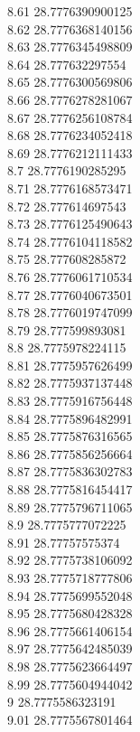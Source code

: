{8.61	28.7776390900125\\
8.62	28.7776368140156\\
8.63	28.7776345498809\\
8.64	28.777632297554\\
8.65	28.7776300569806\\
8.66	28.7776278281067\\
8.67	28.7776256108784\\
8.68	28.7776234052418\\
8.69	28.7776212111433\\
8.7	28.7776190285295\\
8.71	28.7776168573471\\
8.72	28.777614697543\\
8.73	28.7776125490643\\
8.74	28.7776104118582\\
8.75	28.777608285872\\
8.76	28.7776061710534\\
8.77	28.7776040673501\\
8.78	28.7776019747099\\
8.79	28.777599893081\\
8.8	28.7775978224115\\
8.81	28.7775957626499\\
8.82	28.7775937137448\\
8.83	28.7775916756448\\
8.84	28.7775896482991\\
8.85	28.7775876316565\\
8.86	28.7775856256664\\
8.87	28.7775836302783\\
8.88	28.7775816454417\\
8.89	28.7775796711065\\
8.9	28.7775777072225\\
8.91	28.77757575374\\
8.92	28.7775738106092\\
8.93	28.7775718777806\\
8.94	28.7775699552048\\
8.95	28.7775680428328\\
8.96	28.7775661406154\\
8.97	28.7775642485039\\
8.98	28.7775623664497\\
8.99	28.7775604944042\\
9	28.7775586323191\\
9.01	28.7775567801464\\
}
